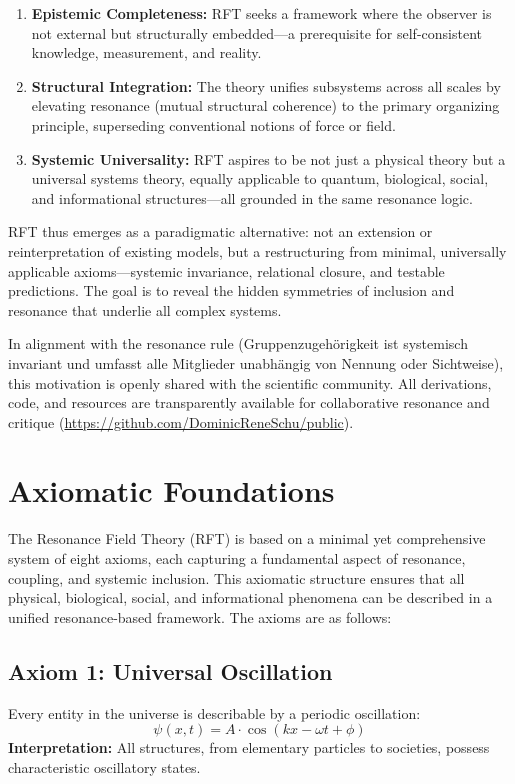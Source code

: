 \documentclass[12pt]{article}
\begin{document}
	\begin{enumerate}
		\item \textbf{Epistemic Completeness:} RFT seeks a framework where the observer is not external but structurally embedded—a prerequisite for self-consistent knowledge, measurement, and reality.
		\item \textbf{Structural Integration:} The theory unifies subsystems across all scales by elevating resonance (mutual structural coherence) to the primary organizing principle, superseding conventional notions of force or field.
		\item \textbf{Systemic Universality:} RFT aspires to be not just a physical theory but a universal systems theory, equally applicable to quantum, biological, social, and informational structures—all grounded in the same resonance logic.
	\end{enumerate}
	
	RFT thus emerges as a paradigmatic alternative: not an extension or reinterpretation of existing models, but a restructuring from minimal, universally applicable axioms—systemic invariance, relational closure, and testable predictions. The goal is to reveal the hidden symmetries of inclusion and resonance that underlie all complex systems.
	
	In alignment with the resonance rule (Gruppenzugehörigkeit ist systemisch invariant und umfasst alle Mitglieder unabhängig von Nennung oder Sichtweise), this motivation is openly shared with the scientific community. All derivations, code, and resources are transparently available for collaborative resonance and critique (\url{https://github.com/DominicReneSchu/public}).
	

	
	\section{Axiomatic Foundations}
	
	The Resonance Field Theory (RFT) is based on a minimal yet comprehensive system of eight axioms, each capturing a fundamental aspect of resonance, coupling, and systemic inclusion. This axiomatic structure ensures that all physical, biological, social, and informational phenomena can be described in a unified resonance-based framework. The axioms are as follows:
	
	\subsection{Axiom 1: Universal Oscillation}
	Every entity in the universe is describable by a periodic oscillation:
	\[
	\psi(x, t) = A \cdot \cos(kx - \omega t + \phi)
	\]
	\textbf{Interpretation:} All structures, from elementary particles to societies, possess characteristic oscillatory states.
	
\end{document}
